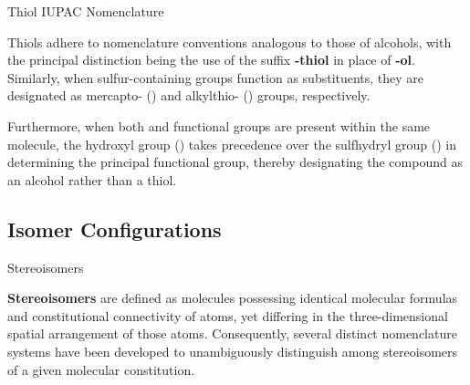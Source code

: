 \documentclass[10pt]{article}
\begin{document}
    \begin{core}{Thiol IUPAC Nomenclature}

      Thiols adhere to nomenclature conventions analogous to those of alcohols, with the principal distinction being the use of the suffix \textbf{-thiol} in place of \textbf{-ol}. Similarly, when sulfur-containing groups function as substituents, they are designated as mercapto- () and alkylthio- () groups, respectively.

      \vspace{-1cm}

      Furthermore, when both  and  functional groups are present within the same molecule, the hydroxyl group () takes precedence over the sulfhydryl group () in determining the principal functional group, thereby designating the compound as an alcohol rather than a thiol.


    \end{core}

  \subsection{Isomer Configurations}

    \begin{core}{Stereoisomers}

      \textbf{Stereoisomers} are defined as molecules possessing identical molecular formulas and constitutional connectivity of atoms, yet differing in the three-dimensional spatial arrangement of those atoms. Consequently, several distinct nomenclature systems have been developed to unambiguously distinguish among stereoisomers of a given molecular constitution.

    \end{core}
\end{document}
